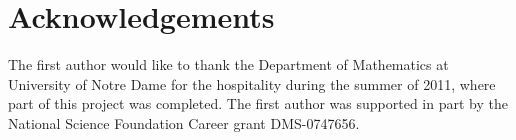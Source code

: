\documentclass{amsart}
\begin{document}
\section*{Acknowledgements}
The first author would like to thank the Department of Mathematics at University of Notre Dame for the hospitality during the summer of 2011, where part of this project was completed. The first author was supported in part by the National Science Foundation Career grant DMS-0747656.



\end{document}
